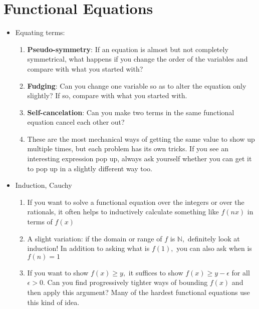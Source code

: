 \newpage\section{Functional Equations}

\begin{itemize}[left=0pt, itemsep=2em]
    \item Equating terms:
        \begin{enumerate}[left=0pt,label=\textbf{\arabic*.}]
            \item \textbf{Pseudo-symmetry}: If an equation is almost but not
                completely symmetrical, what happens if you change the order of
                the variables and compare with what you started with?

            \item \textbf{Fudging}: Can you change one variable so as to alter the
                equation only slightly? If so, compare with what you started with.

            \item \textbf{Self-cancelation}: Can you make two terms in the same
                functional equation cancel each other out?

            \item These are the most mechanical ways of getting the same value to
                show up multiple times, but each problem has its own tricks. If
                you see an interesting expression pop up, always ask yourself
                whether you can get it to pop up in a slightly different way too.
        \end{enumerate}
    \item Induction, Cauchy
        \begin{enumerate}[left=0pt,label=\textbf{\arabic*.}]
            \item If you want to solve a functional equation over the integers or
                over the rationals, it often helps to inductively calculate
                something like $f(n x)$ in terms of $f(x)$

            \item A slight variation: if the domain or range of $f$ is $\mathbb{N},$
                definitely look at induction! In addition to asking what is $f(1),$ you
                can also ask when is $f(n)=1$

            \item If you want to show $f(x) \geq y,$ it suffices to show
                $f(x) \geq y-\epsilon$ for all $\epsilon>0 .$ Can you find
                progressively tighter ways of bounding $f(x)$ and then
                apply this argument? Many of the hardest functional
                equations use this kind of idea.
        \end{enumerate}


\end{itemize}
